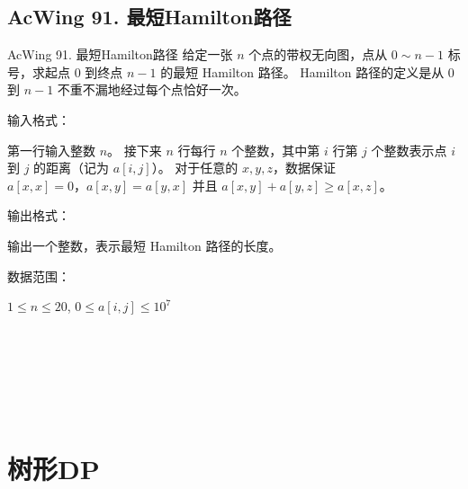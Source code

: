 \subsection{AcWing 91. 最短Hamilton路径}
\begin{titledbox}{AcWing 91. 最短Hamilton路径}
    给定一张 $n$ 个点的带权无向图，点从 $0 \sim n-1$ 标号，求起点 $0$ 到终点 $n-1$ 的最短 Hamilton 路径。 Hamilton 路径的定义是从 $0$ 到 $n-1$ 不重不漏地经过每个点恰好一次。

    输入格式：

    第一行输入整数 $n$。 接下来 $n$ 行每行 $n$ 个整数，其中第 $i$ 行第 $j$ 个整数表示点 $i$ 到 $j$ 的距离（记为 $a[i,j]$）。 对于任意的 $x,y,z$，数据保证 $a[x,x]=0，a[x,y]=a[y,x]$ 并且 $a[x,y]+a[y,z] \ge a[x,z]$。

    输出格式：

    输出一个整数，表示最短 Hamilton 路径的长度。

    数据范围：

    $1 \le n \le 20$, $0 \le a[i,j] \le 10^7$

    \begin{inputblock}
         \\
         \\
         \\
         \\
         \\
    \end{inputblock}
    \begin{outputblock}
    \end{outputblock}
\end{titledbox}


\section{树形DP}

